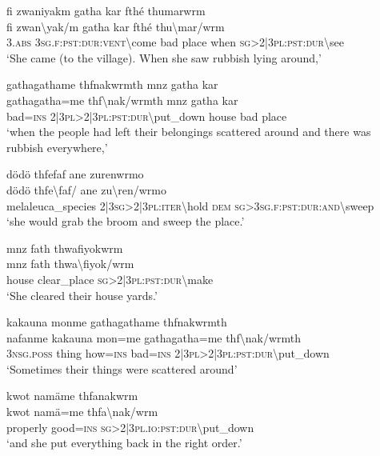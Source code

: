\ea\label{ex:7:a4689}
fi zwaniyakm gatha kar fthé thumarwrm\\
\gll fi	zwan{\textbackslash}yak/m	gatha	kar	fthé	thu{\textbackslash}mar/wrm\\
     3.\textsc{abs}	3\textsc{sg}.\textsc{f}:\textsc{pst}:\textsc{dur}:\textsc{vent}{\textbackslash}come	bad	place	when	\textsc{sg}>2|3\textsc{pl}:\textsc{pst}:\textsc{dur}{\textbackslash}see\\
\glt `She came (to the village). When she saw rubbish lying around,'
\z

\ea\label{ex:7:a4691}
gathagathame thfnakwrmth mnz gatha kar\\
\gll gathagatha=me	thf{\textbackslash}nak/wrmth	mnz	gatha	kar\\
     bad=\textsc{ins}	2|3\textsc{pl}>2|3\textsc{pl}:\textsc{pst}:\textsc{dur}{\textbackslash}put\_down	house	bad	place\\
\glt `when the people had left their belongings scattered around and there was rubbish everywhere,'
\z

\ea\label{ex:7:a4692}
dödö thfefaf ane zurenwrmo\\
\gll dödö	thfe{\textbackslash}faf/	ane	zu{\textbackslash}ren/wrmo\\
     melaleuca\_species	2|3\textsc{sg}>2|3\textsc{pl}:\textsc{iter}{\textbackslash}hold	\textsc{dem}	\textsc{sg}>3\textsc{sg}.\textsc{f}:\textsc{pst}:\textsc{dur}:\textsc{and}{\textbackslash}sweep\\
\glt `she would grab the broom and sweep the place.'
\z

\newpage
\ea\label{ex:7:a4693}
mnz fath thwafiyokwrm\\
\gll mnz	fath	thwa{\textbackslash}fiyok/wrm\\
     house	clear\_place	\textsc{sg}>2|3\textsc{pl}:\textsc{pst}:\textsc{dur}{\textbackslash}make\\
\glt `She cleared their house yards.'
\z

\ea\label{ex:7:a4694}
kakauna monme gathagathame thfnakwrmth\\
\gll nafanme	kakauna	mon=me	gathagatha=me	thf{\textbackslash}nak/wrmth\\
     3\textsc{nsg}.\textsc{poss}	thing	how=\textsc{ins}	bad=\textsc{ins}	2|3\textsc{pl}>2|3\textsc{pl}:\textsc{pst}:\textsc{dur}{\textbackslash}put\_down\\
\glt `Sometimes their things were scattered around'
\z

\ea\label{ex:7:a4695}
kwot namäme thfanakwrm\\
\gll kwot	namä=me	thfa{\textbackslash}nak/wrm\\
     properly	good=\textsc{ins}	\textsc{sg}>2|3\textsc{pl}.\textsc{io}:\textsc{pst}:\textsc{dur}{\textbackslash}put\_down\\
\glt `and she put everything back in the right order.'
\z

